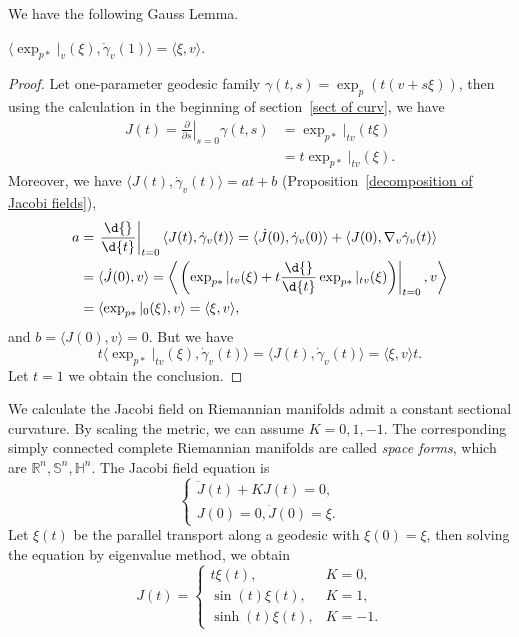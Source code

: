 We have the following Gauss Lemma.
\begin{prop}
    $\langle\exp_{p*}|_v(\xi),\dot{\gamma}_v(1)\rangle=\langle\xi,v\rangle$.
\end{prop}
\begin{proof}
    Let one-parameter geodesic family $\gamma(t,s)=\exp_p(t(v+s\xi))$, then using the calculation in the beginning of section~\ref{sect of curv}, we have
    \begin{align*}
        J(t)=\left.\frac{\partial{}}{\partial{s}}\right|_{s=0}\gamma(t,s)&=\exp_{p*}|_{tv}(t\xi)\\
        &=t\exp_{p*}|_{tv}(\xi).
    \end{align*}
    Moreover, we have $\langle J(t),\dot{\gamma}_v(t)\rangle=at+b$ (Proposition~\ref{decomposition of Jacobi fields}),
    \begin{align*}
        a&=\left.\frac{\d{}}{\d{t}}\right|_{t=0}\langle J(t),\dot{\gamma}_v(t)\rangle=\langle\dot{J}(0),\dot{\gamma}_v(0)\rangle+\langle J(0),\nabla_v\dot{\gamma}_v(t)\rangle\\
        &=\langle\dot{J}(0),v\rangle=\left\langle\left.\left(\exp_{p*}|_{tv}(\xi)+t\frac{\d{}}{\d{t}}\exp_{p*}|_{tv}(\xi)\right)\right|_{t=0},v\right\rangle\\
        &=\langle\exp_{p*}|_0(\xi),v\rangle=\langle\xi,v\rangle,
    \end{align*}
    and $b=\langle J(0),v\rangle=0$.
    But we have
    \[t\langle\exp_{p*}|_{tv}(\xi),\dot{\gamma}_v(t)\rangle=\langle J(t),\dot{\gamma}_v(t)\rangle=\langle\xi,v\rangle t.\]
    Let $t=1$ we obtain the conclusion.
\end{proof}

\begin{eg}
    We calculate the Jacobi field on Riemannian manifolds admit a constant sectional curvature.
    By scaling the metric, we can assume $K=0,1,-1$.
    The corresponding simply connected complete Riemannian manifolds are called \emph{space forms}, which are $\mathbb{R}^n,\mathbb{S}^n,\mathbb{H}^n$.
    The Jacobi field equation is
    \[\begin{cases}
        \ddot{J}(t)+KJ(t)=0,\\
        J(0)=0,\dot{J}(0)=\xi.
    \end{cases}\]
    Let $\xi(t)$ be the parallel transport along a geodesic with $\xi(0)=\xi$, then solving the equation by eigenvalue method, we obtain
    \[J(t)=\begin{cases}
        t\xi(t), & K=0,\\
        \sin(t)\xi(t), & K=1,\\
        \sinh(t)\xi(t), & K=-1.
    \end{cases}\]
\end{eg}

